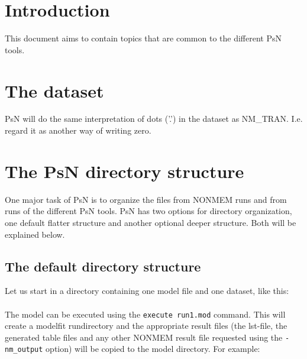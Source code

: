 

\usepackage{tabularx}
\usepackage{hyperref}
\usepackage{dirtree}


	
	
	\maketitle
	\newcommand{\guidetoolname}{<toolname>}
	\tableofcontents
	\newpage
	
	\section{Introduction}
	This document aims to contain topics that are common to the different PsN tools.

    \section{The dataset}
    PsN will do the same interpretation of dots ('.') in the dataset as NM\_TRAN. I.e. regard it as another way of writing zero.

    \section{The PsN directory structure}
One major task of PsN is to organize the files from NONMEM runs and from runs of the different PsN tools. PsN has two options for directory organization, one default flatter structure and another optional deeper structure. Both will be explained below.
\subsection{The default directory structure}
Let us start in a directory containing one model file and one dataset, like this:
\\
~\\
The model can be executed using the \verb|execute run1.mod| command. This will create a modelfit rundirectory and the appropriate result files (the lst-file, the generated table files and any other NONMEM result file requested using the \verb|-nm_output| option) will be copied to the model directory. For example:
\\

